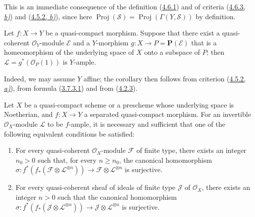 This is an immediate consequence of the definition
(\hyperref[II.4.6.1]{4.6.1}) and of criteria
(\hyperref[II.4.6.3]{4.6.3, \emph{b)}}) and
(\hyperref[II.4.5.2]{4.5.2, \emph{b)}}), since here
$\operatorname{Proj}(\mathcal{S})
=\operatorname{Proj}(\Gamma(Y,\mathcal{S}))$ by definition.

\begin{corollary}[4.6.7]
\label{II.4.6.7}
Let $f:X\to Y$ be a quasi-compact morphism. Suppose that there exist a
quasi-coherent $\mathcal{O}_Y$-module $\mathcal{E}$ and a $Y$-morphism
$g:X\to P=\mathbf{P}(\mathcal{E})$ that is a homeomorphism of the underlying
space of $X$ onto a subspace of $P$; then
$\mathcal{L}=g^*(\mathcal{O}_P(1))$ is $Y$-ample.
\end{corollary}

Indeed, we may assume $Y$ affine; the corollary then follows from
criterion (\hyperref[II.4.5.2]{4.5.2, \emph{a)}}), from formula
(\hyperref[II.3.7.3.1]{3.7.3.1}) and from
(\hyperref[II.4.2.3]{4.2.3}).

\begin{proposition}[4.6.8]
\label{II.4.6.8}
Let $X$ be a quasi-compact scheme or a prescheme whose underlying
space is Noetherian, and $f:X\to Y$ a separated quasi-compact morphism.
For an invertible $\mathcal{O}_X$-module $\mathcal{L}$ to be $f$-ample,
it is necessary and sufficient that one of the following equivalent conditions be
satisfied:
\begin{enumerate}
  \item[\rm{c)}] For every quasi-coherent $\mathcal{O}_X$-module
  $\mathcal{F}$ of finite type, there exists an integer $n_0>0$ such that, for
  every $n\geq n_0$, the canonical homomorphism
  $\sigma:f^*(f_*(\mathcal{F}\otimes\mathcal{L}^{\otimes n}))\to
  \mathcal{F}\otimes\mathcal{L}^{\otimes n}$ is surjective.
  \item[\rm{c')}] For every quasi-coherent sheaf of ideals of finite type
  $\mathcal{J}$ of $\mathcal{O}_X$, there exists an integer $n>0$ such that
  the canonical homomorphism
  $\sigma:f^*(f_*(\mathcal{J}\otimes\mathcal{L}^{\otimes n}))\to
  \mathcal{J}\otimes\mathcal{L}^{\otimes n}$ is surjective.
\end{enumerate}
\end{proposition}

